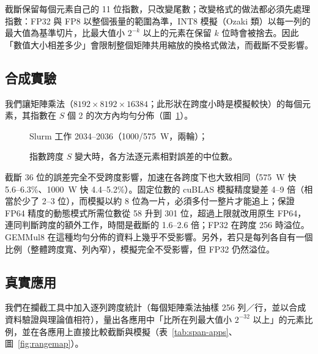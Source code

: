 截斷保留每個元素自己的 11 位指數，只改變尾數；改變格式的做法都必須先處理指數：FP32 與 FP8 以整個張量的範圍為準，INT8 模擬（Ozaki 類）以每一列的最大值為基準切片，比最大值小 $2^{-k}$ 以上的元素在保留 $k$ 位時會被捨去。因此「數值大小相差多少」會限制整個矩陣共用縮放的換格式做法，而截斷不受影響。

\subsection{合成實驗}\label{sec:span-synth}

我們讓矩陣乘法（$8192\times8192\times16384$；此形狀在跨度小時是模擬較快）的每個元素，其指數在 $S$ 個 2 的次方內均勻分佈（圖~\ref{fig:span}）。

\begin{figure}[tbp]
\centering
{}
\caption[指數跨度對各方法逐元素誤差的影響]{指數跨度 $S$ 變大時，各方法逐元素相對誤差的中位數。}\label{fig:span}
\begin{figsource}Slurm 工作 2034–2036（1000/575~W，兩輪）；\end{figsource}
\end{figure}

截斷 36 位的誤差完全不受跨度影響，加速在各跨度下也大致相同（575~W 快 5.6–6.3\%、1000~W 快 4.4–5.2\%）。固定位數的 cuBLAS 模擬精度變差 4–9 倍（相當於少了 2–3 位），而模擬以約 8 位為一片，必須多付一整片才能追上；保證 FP64 精度的動態模式所需位數從 58 升到 301 位，超過上限就改用原生 FP64，連同判斷跨度的額外工作，時間是截斷的 1.6–2.6 倍；FP32 在跨度 256 時溢位。GEMMul8 在這種均勻分佈的資料上幾乎不受影響。另外，若只是每列各自有一個比例（整體跨度寬、列內窄），模擬完全不受影響，但 FP32 仍然溢位。

\subsection{真實應用}\label{sec:span-apps}

我們在攔截工具中加入逐列跨度統計（每個矩陣乘法抽樣 256 列／行，並以合成資料驗證與理論值相符），量出各應用中「比所在列最大值小 $2^{-32}$ 以上」的元素比例，並在各應用上直接比較截斷與模擬（表~\ref{tab:span-apps}、圖~\ref{fig:rangemap}）。

